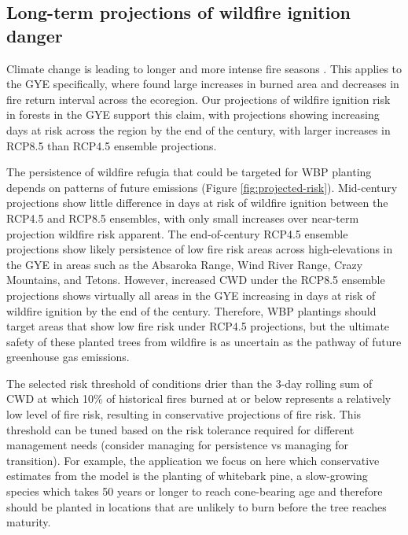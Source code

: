 \documentclass[11p]{article}
\begin{document}
\begin{table}
{\subsection{Long-term projections of wildfire ignition danger}

Climate change is leading to longer and more intense fire seasons \citep{abatzoglouImpactAnthropogenicClimate2016,abatzoglouProjectedIncreasesWestern2021,littellReviewRelationshipsDrought2016,jollyClimateinducedVariationsGlobal2015}. This applies to the GYE specifically, where \citet{westerlingContinuedWarmingCould2011} found large increases in burned area and decreases in fire return interval across the ecoregion. Our projections of wildfire ignition risk in forests in the GYE support this claim, with projections showing increasing days at risk across the region by the end of the century, with larger increases in RCP8.5 than RCP4.5 ensemble projections.

The persistence of wildfire refugia that could be targeted for WBP planting depends on patterns of future emissions (Figure \ref{fig:projected-risk}). Mid-century projections show little difference in days at risk of wildfire ignition between the RCP4.5 and RCP8.5 ensembles, with only small increases over near-term projection wildfire risk apparent. The end-of-century RCP4.5 ensemble projections show likely persistence of low fire risk areas across high-elevations in the GYE in areas such as the Absaroka Range, Wind River Range, Crazy Mountains, and Tetons. However, increased CWD under the RCP8.5 ensemble projections shows virtually all areas in the GYE increasing in days at risk of wildfire ignition by the end of the century. Therefore, WBP plantings should target areas that show low fire risk under RCP4.5 projections, but the ultimate safety of these planted trees from wildfire is as uncertain as the pathway of future greenhouse gas emissions.

The selected risk threshold of conditions drier than the 3-day rolling sum of CWD at which 10\% of historical fires burned at or below represents a relatively low level of fire risk, resulting in conservative projections of fire risk. This threshold can be tuned based on the risk tolerance required for different management needs (consider managing for persistence vs managing for transition). For example, the application we focus on here which conservative estimates from the model is the planting of whitebark pine, a slow-growing species which takes 50 years or longer to reach cone-bearing age \citep{tombackWhitebarkPineCommunities2001} and therefore should be planted in locations that are unlikely to burn before the tree reaches maturity.

}
\end{table}
\end{document}
